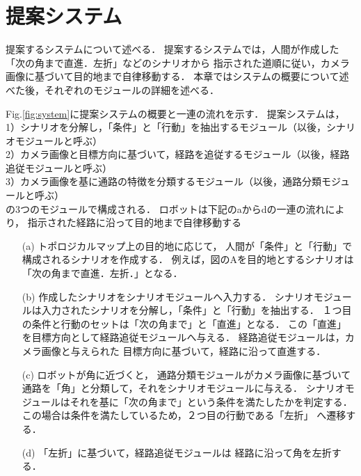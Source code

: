 \documentclass{sice-si}
\begin{document}
\section{提案システム}
提案するシステムについて述べる．
提案するシステムでは，人間が作成した「次の角まで直進．左折」などのシナリオから
指示された道順に従い，カメラ画像に基づいて目的地まで自律移動する．
本章ではシステムの概要について述べた後，それぞれのモジュールの詳細を述べる．
\par
Fig.\ref{fig:system}に提案システムの概要と一連の流れを示す．
提案システムは，\\
1）シナリオを分解し，「条件」と「行動」を抽出するモジュール（以後，シナリオモジュールと呼ぶ）\\
2）カメラ画像と目標方向に基づいて，経路を追従するモジュール（以後，経路追従モジュールと呼ぶ）\\
3）カメラ画像を基に通路の特徴を分類するモジュール（以後，通路分類モジュールと呼ぶ）\\
の3つのモジュールで構成される．
ロボットは下記のaからdの一連の流れにより，
指示された経路に沿って目的地まで自律移動する
\begin{enumerate}
    \item [(a)] トポロジカルマップ上の目的地に応じて，
    人間が「条件」と「行動」で構成されるシナリオを作成する．
    例えば，図のAを目的地とするシナリオは「次の角まで直進．左折．」となる．
    \item [(b)] 作成したシナリオをシナリオモジュールへ入力する．
    シナリオモジュールは入力されたシナリオを分解し，「条件」と「行動」を抽出する．
    １つ目の条件と行動のセットは「次の角まで」と「直進」となる．
    この「直進」を目標方向として経路追従モジュールへ与える．
    経路追従モジュールは，カメラ画像と与えられた
    目標方向に基づいて，経路に沿って直進する．
    \item [(c)] ロボットが角に近づくと，
    通路分類モジュールがカメラ画像に基づいて
    通路を「角」と分類して，それをシナリオモジュールに与える．
    シナリオモジュールはそれを基に「次の角まで」という条件を満たしたかを判定する．
    この場合は条件を満たしているため，２つ目の行動である「左折」
    へ遷移する．
    \item [(d)]「左折」に基づいて，経路追従モジュールは
    経路に沿って角を左折する．
\end{enumerate}
\end{document}
